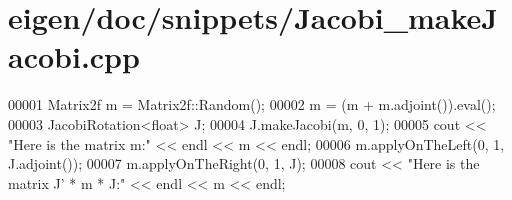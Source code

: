\hypertarget{eigen_2doc_2snippets_2_jacobi__make_jacobi_8cpp_source}{}\section{eigen/doc/snippets/\+Jacobi\+\_\+make\+Jacobi.cpp}
\label{eigen_2doc_2snippets_2_jacobi__make_jacobi_8cpp_source}

\begin{DoxyCode}
00001 Matrix2f m = Matrix2f::Random();
00002 m = (m + m.adjoint()).eval();
00003 JacobiRotation<float> J;
00004 J.makeJacobi(m, 0, 1);
00005 cout << \textcolor{stringliteral}{"Here is the matrix m:"} << endl << m << endl;
00006 m.applyOnTheLeft(0, 1, J.adjoint());
00007 m.applyOnTheRight(0, 1, J);
00008 cout << \textcolor{stringliteral}{"Here is the matrix J' * m * J:"} << endl << m << endl;
\end{DoxyCode}
